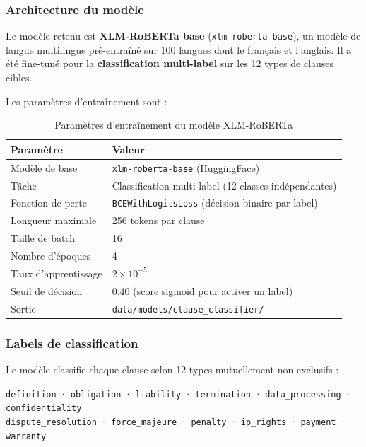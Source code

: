\subsubsection{Architecture du modèle}

Le modèle retenu est \textbf{XLM-RoBERTa base} (\texttt{xlm-roberta-base}), un modèle de langue multilingue pré-entraîné sur 100 langues dont le français et l'anglais. Il a été fine-tuné pour la \textbf{classification multi-label} sur les 12 types de clauses cibles.

Les paramètres d'entraînement sont :

\begin{table}[H]
\centering
\renewcommand{\arraystretch}{1.4}
\begin{tabular}{|p{5cm}|p{8.5cm}|}
\hline
\rowcolor[HTML]{D6E4F0}
\textbf{Paramètre} & \textbf{Valeur} \\
\hline
Modèle de base & \texttt{xlm-roberta-base} (HuggingFace) \\
\hline
Tâche & Classification multi-label (12 classes indépendantes) \\
\hline
Fonction de perte & \texttt{BCEWithLogitsLoss} (décision binaire par label) \\
\hline
Longueur maximale & 256 tokens par clause \\
\hline
Taille de batch & 16 \\
\hline
Nombre d'époques & 4 \\
\hline
Taux d'apprentissage & $2 \times 10^{-5}$ \\
\hline
Seuil de décision & 0.40 (score sigmoid pour activer un label) \\
\hline
Sortie & \texttt{data/models/clause\_classifier/} \\
\hline
\end{tabular}
\caption{Paramètres d'entraînement du modèle XLM-RoBERTa}
\label{tab:training_params}
\end{table}

\subsubsection{Labels de classification}

Le modèle classifie chaque clause selon 12 types mutuellement non-exclusifs :

\vspace{0.4em}
\begin{center}
\texttt{definition} · \texttt{obligation} · \texttt{liability} · \texttt{termination} · \texttt{data\_processing} · \texttt{confidentiality} \\[0.3em]
\texttt{dispute\_resolution} · \texttt{force\_majeure} · \texttt{penalty} · \texttt{ip\_rights} · \texttt{payment} · \texttt{warranty}
\end{center}
\vspace{0.4em}


